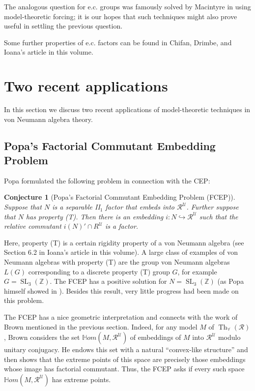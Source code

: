 \documentclass[12pt]{amsart}
\newtheorem{conj}[thm]{Conjecture}
\theoremstyle{definition}
\def\bb{\mathbb}
\def\bb{\mathbb}
\def\u{\mathsf 1}
\def \Th{\operatorname{Th}}
\def \R{\mathcal R}
\def \u{\mathcal U}
\begin{document}
The analogous question for e.c. groups was famously solved by Macintyre in \cite{macintyre} using model-theoretic forcing; it is our hopes that such techniques might also prove useful in settling the previous question.

Some further properties of e.c. factors can be found in Chifan, Drimbe, and Ioana's article in this volume.

\section{Two recent applications}

In this section we discuss two recent applications of model-theoretic techniques in von Neumann algebra theory.

\subsection{Popa's Factorial Commutant Embedding Problem}\label{FCEP}

Popa formulated the following problem in connection with the CEP:

\begin{conj}[Popa's Factorial Commutant Embedding Problem (FCEP)]\label{popafcep}
Suppose that $N$ is a separable II$_1$ factor that embeds into $\R^\u$.  Further suppose that $N$ has \emph{property (T)}.  Then there is an embedding $i:N\hookrightarrow \R^\u$ such that the relative commutant $i(N)'\cap R^\u$ is a factor. 
\end{conj}

Here, property (T) is a certain rigidity property of a von Neumann algebra (see Section 6.2 in Ioana's article in this volume).  A large class of examples of von Neumann algebras with property (T) are the group von Neumann algebras $L(G)$ corresponding to a discrete property (T) group $G$, for example $G=\operatorname{SL}_3(\bb Z)$.  The FCEP has a positive solution for $N=\operatorname{SL}_3(\bb Z)$ (as Popa himself showed in \cite[Section 1.7]{popa}).  Besides this result, very little progress had been made on this problem.

The FCEP has a nice geometric interpretation and connects with the work of Brown mentioned in the previous section.  Indeed, for any model $M$ of $\Th_\forall(\R)$, Brown considers the set $\bb Hom(M,\R^\u)$ of embeddings of $M$ into $\R^\u$ modulo unitary conjugacy.  He endows this set with a natural ``convex-like structure'' and then shows that the extreme points of this space are precisely those embeddings whose image has factorial commutant.  Thus, the FCEP asks if every such space $\bb Hom(M,\R^\u)$ has extreme points.  
\end{document}
